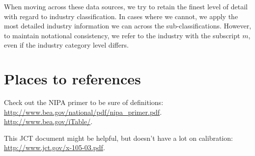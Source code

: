 \documentclass[article,11pt,letterpaper,fleqn]{article}
\theoremstyle{definition}
\numberwithin{equation}{section}
\begin{document}
When moving across these data sources, we try to retain the finest level of detail with regard to industry classification.  In cases where we cannot, we apply the most detailed industry information we can across the sub-classifications.  However, to maintain notational consistency, we refer to the industry with the subscript $m$, even if the industry category level differs.

\section{Places to references}

Check out the NIPA primer to be sure of definitions: \href{http://www.bea.gov/national/pdf/nipa\_primer.pdf}{http://www.bea.gov/national/pdf/nipa\_primer.pdf}.  \href{NIPA Tables}{http://www.bea.gov/iTable/}.

This JCT document might be helpful, but doesn't have a lot on calibration: \href{http://www.jct.gov/x-105-03.pdf}{http://www.jct.gov/x-105-03.pdf}.



\end{document}
